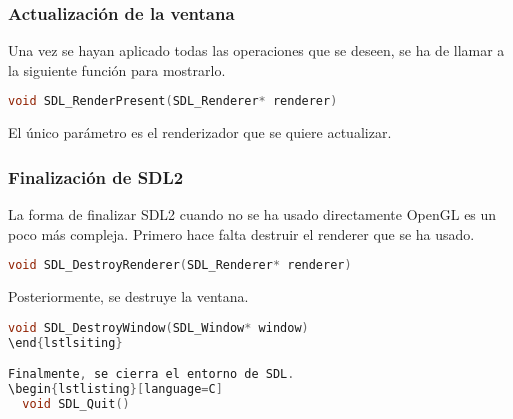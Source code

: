 \subsubsection{Actualización de la ventana}
Una vez se hayan aplicado todas las operaciones que se deseen, se ha de llamar a la siguiente función para mostrarlo.
\begin{lstlisting}[language=C]
  void SDL_RenderPresent(SDL_Renderer* renderer)
\end{lstlisting}
El único parámetro es el renderizador que se quiere actualizar.
\newpage

\subsubsection{Finalización de SDL2}
La forma de finalizar SDL2 cuando no se ha usado directamente OpenGL es un poco más compleja.
Primero hace falta destruir el renderer que se ha usado.
\begin{lstlisting}[language=C]
  void SDL_DestroyRenderer(SDL_Renderer* renderer)
\end{lstlisting}
Posteriormente, se destruye la ventana.
\begin{lstlisting}[language=C]
  void SDL_DestroyWindow(SDL_Window* window)
\end{lstlsiting}

Finalmente, se cierra el entorno de SDL.
\begin{lstlisting}[language=C]
  void SDL_Quit()
\end{lstlisting}
